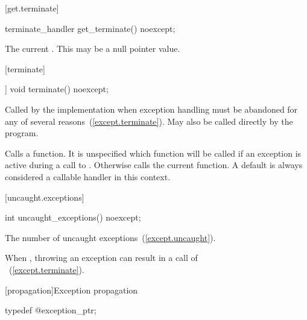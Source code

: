[get.terminate]{}

\begin{itemdecl}
terminate_handler get_terminate() noexcept;
\end{itemdecl}

\begin{itemdescr}
\pnum
\returns The current .
\enternote This may be a null pointer value. \exitnote
\end{itemdescr}

[terminate]{}

%
\begin{itemdecl}
[[noreturn]] void terminate() noexcept;
\end{itemdecl}

\begin{itemdescr}
\pnum
\remarks
Called by the implementation when exception
handling must be abandoned for any of several reasons~(\ref{except.terminate}).
May also be called directly by the program.

\pnum
\effects
Calls a  function. It is unspecified which
 function will be called if an exception is active
during a call to .
Otherwise calls the current  function. \enternote A
default  is always considered a callable handler in
this context. \exitnote
\end{itemdescr}

[uncaught.exceptions]{}

%
\begin{itemdecl}
int uncaught_exceptions() noexcept;
\end{itemdecl}

\begin{itemdescr}
\pnum
\returns
The number of uncaught exceptions~(\ref{except.uncaught}).

\pnum
\remarks
When ,
throwing an exception can result in a call of\\
~(\ref{except.terminate}).
\end{itemdescr}

[propagation]{Exception propagation}

\begin{itemdecl}
typedef @\unspec@ exception_ptr;
\end{itemdecl}

